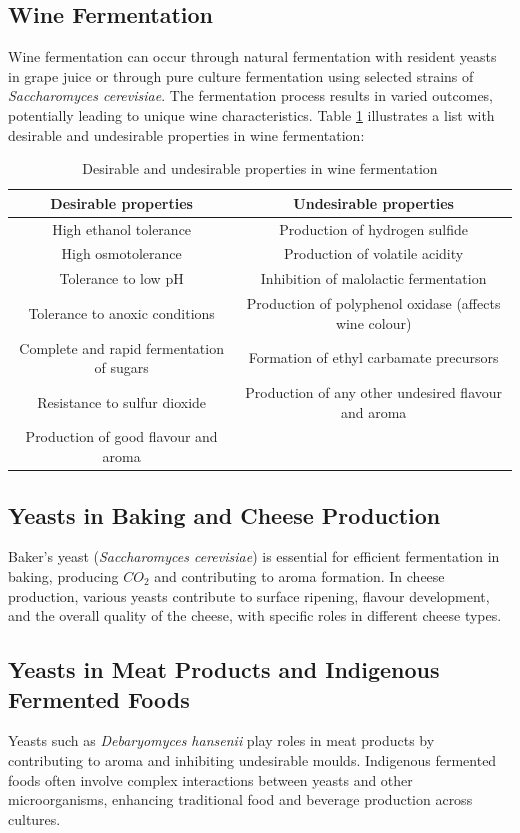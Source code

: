 \subsection{Wine Fermentation} 
Wine fermentation can occur through natural fermentation with resident yeasts in grape juice or through pure culture fermentation using selected strains of \textit{Saccharomyces cerevisiae}. The fermentation process results in varied outcomes, potentially leading to unique wine characteristics.
Table \ref*{tab:WineFermentation} illustrates a list with desirable and undesirable properties in wine fermentation:

\begin{table}[h]
    \centering
    \caption{Desirable and undesirable properties in wine fermentation}
    \label{tab:WineFermentation}
    \begin{tabular}{c|c}
        \textbf{Desirable properties} & \textbf{Undesirable properties} \\
        \hline
        High ethanol tolerance & Production of hydrogen sulfide \\
        High osmotolerance & Production of volatile acidity \\
        Tolerance to low pH & Inhibition of malolactic fermentation \\
        Tolerance to anoxic conditions & Production of polyphenol oxidase (affects wine colour) \\
        Complete and rapid fermentation of sugars & Formation of ethyl carbamate precursors \\
        Resistance to sulfur dioxide & Production of any other undesired flavour and aroma \\
        Production of good flavour and aroma &  \\
    \end{tabular}
\end{table}


\subsection{Yeasts in Baking and Cheese Production} 
Baker's yeast (\textit{Saccharomyces cerevisiae}) is essential for efficient fermentation in baking, producing $CO_2$ and contributing to aroma formation. In cheese production, various yeasts contribute to surface ripening, flavour development, and the overall quality of the cheese, with specific roles in different cheese types.

\subsection{Yeasts in Meat Products and Indigenous Fermented Foods} 
Yeasts such as \textit{Debaryomyces hansenii} play roles in meat products by contributing to aroma and inhibiting undesirable moulds. Indigenous fermented foods often involve complex interactions between yeasts and other microorganisms, enhancing traditional food and beverage production across cultures.

